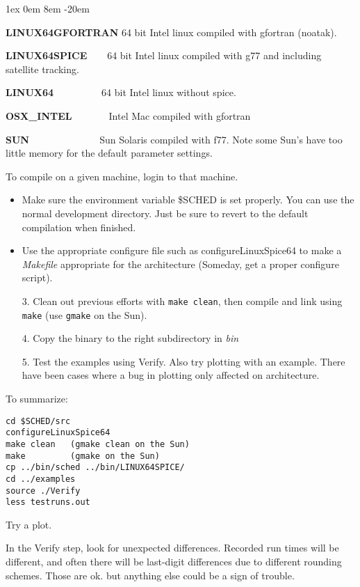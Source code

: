 \documentclass{report}
\begin{document}
\begin{description}
\begin{list}{}{\parsep 1ex  \itemsep 0em
                 \leftmargin 8em  \itemindent -20em }
  \item {\bf LINUX64GFORTRAN}  64 bit Intel linux compiled with gfortran (noatak).
  \item {\bf LINUX64SPICE~~~}  64 bit Intel linux compiled with g77 and 
                   including satellite tracking.
  \item {\bf LINUX64~~~~~~~~}  64 bit Intel linux without spice.
  \item {\bf OSX\_INTEL~~~~~~}  Intel Mac compiled with gfortran
  \item {\bf SUN~~~~~~~~~~~~}  Sun Solaris compiled with f77.
        Note some Sun's have too little memory for the default
        parameter settings.
\end{list}


To compile on a given machine, login to that machine.

\begin{itemize}

\item Make sure the environment variable \$SCHED is set properly.  You
can use the normal development directory.  Just be sure to revert to
the default compilation when finished.

\item Use the appropriate configure file such as configureLinuxSpice64
to make a {\sl Makefile} appropriate for the architecture (Someday,
get a proper configure script).

3.  Clean out previous efforts with {\tt make clean}, then compile and
link using {\tt make} (use {\tt gmake} on the Sun).

4.  Copy the binary to the right subdirectory in {\sl bin}

5.  Test the examples using Verify.  Also try plotting with an
example.  There have been cases where a bug in plotting only affected
on architecture.

\end{itemize}

To summarize:

\begin{verbatim}
cd $SCHED/src
configureLinuxSpice64
make clean   (gmake clean on the Sun)
make         (gmake on the Sun)
cp ../bin/sched ../bin/LINUX64SPICE/
cd ../examples
source ./Verify
less testruns.out
\end{verbatim}
Try a plot.

In the Verify step, look for unexpected differences.  Recorded run
times will be different, and often there will be last-digit
differences due to different rounding schemes.  Those are ok.  but
anything else could be a sign of trouble.


\end{description}
\end{document}
